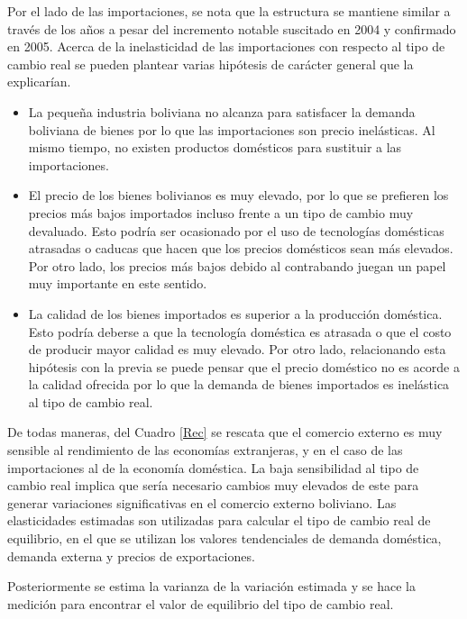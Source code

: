 \documentclass[12pt,letterpaper]{article}
\begin{document}
Por el lado de las importaciones, se nota que la estructura se mantiene similar a través de los años a pesar del incremento notable suscitado en 2004 y confirmado en 2005. Acerca de la inelasticidad de las importaciones con respecto al tipo de cambio real se pueden plantear varias hipótesis de carácter general que la explicarían.
\begin{itemize}
\item La pequeña industria boliviana no alcanza para satisfacer la demanda boliviana de bienes por lo que las importaciones son precio inelásticas. Al mismo tiempo, no existen productos domésticos para sustituir a las importaciones.
\item El precio de los bienes bolivianos es muy elevado, por lo que se prefieren los precios más bajos importados incluso frente a un tipo de cambio muy devaluado. Esto podría ser ocasionado por el uso de tecnologías domésticas atrasadas o caducas que hacen que los precios domésticos sean más elevados. Por otro lado, los precios más bajos debido al contrabando juegan un papel muy importante en este sentido.
\item La calidad de los bienes importados es superior a la producción doméstica. Esto podría deberse a que la tecnología doméstica es atrasada o que el costo de producir mayor calidad es muy elevado. Por otro lado, relacionando esta hipótesis con la previa se puede pensar que el precio doméstico no es acorde a la calidad ofrecida por lo que la demanda de bienes importados es inelástica al tipo de cambio real. 
\end{itemize}

De todas maneras, del Cuadro \ref{Rec} se rescata que el comercio externo es muy sensible al rendimiento de las economías extranjeras, y en el caso de las importaciones al de la economía doméstica. La baja sensibilidad al tipo de cambio real implica que sería necesario cambios muy elevados de este para generar variaciones significativas en el comercio externo boliviano. Las elasticidades estimadas son utilizadas para calcular el tipo de cambio real de equilibrio, en el que se utilizan los valores tendenciales de demanda doméstica, demanda externa y precios de exportaciones.

Posteriormente se estima la varianza de la variación estimada y se hace la medición para encontrar el valor de equilibrio del tipo de cambio real.
\end{document}
